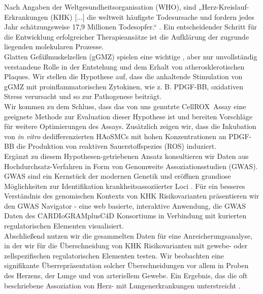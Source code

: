 Nach Angaben der Weltgesundheitsorganisation (WHO), sind „Herz-Kreislauf-Erkrankungen (KHK) [...] die weltweit häufigste Todesursache und fordern jedes Jahr schätzungsweise 17,9 Millionen Todesopfer.“ \cite{whoCardiovascularDiseases2022}. Ein entscheidender Schritt für die Entwicklung erfolgreicher Therapieansätze ist die Aufklärung der zugrunde liegenden molekularen Prozesse.\\
Glatten Gefäßmuskelzellen (gGMZ) spielen eine wichtige \cite{doranRoleSmoothMuscle2008}, aber nur unvollständig verstandene Rolle \cite{liuSmoothMuscleCell2019, grootaertVascularSmoothMuscle2021, yapSixShadesVascular2021} in der Entstehung und dem Erhalt von atherosklerotischen Plaques. Wir stellen die Hypothese auf, dass die anhaltende Stimulation von gGMZ mit proinflammatorischen Zytokinen, wie z. B. PDGF-BB, oxidativen Stress verursacht und so zur Pathogenese beiträgt.\\
Wir kommen zu dem Schluss, dass das von uns genutzte CellROX\texttrademark~Assay eine geeignete Methode zur Evaluation dieser Hypothese ist und bereiten Vorschläge für weitere Optimierungen des Assays. Zusätzlich zeigen wir, dass die Inkubation von \textit{in vitro} dedifferenzierten HAoSMCs mit hohen Konzentrationen an PDGF-BB die Produktion von reaktiven Sauerstoffspezies (ROS) induziert.\\
Ergänzt zu diesem Hypothesen-getriebenen Ansatz konsultieren wir Daten aus Hochdurchsatz-Verfahren in Form von Genomweite Assoziationsstudien (GWAS). GWAS sind ein Kernstück der modernen Genetik und eröffnen grandiose Möglichkeiten zur Identifikation krankheitsassoziierter Loci \cite{uffelmannGenomewideAssociationStudies2021}. Für ein besseres Verständnis des genomischen Kontexts von KHK Risikovarianten präsentieren wir den GWAS Navigator - eine web basierte, interaktive Anwendung, die GWAS Daten des CARDIoGRAMplusC4D Konsortiums \cite{aragamDiscoverySystematicCharacterization2021} in Verbindung mit kurierten regulatorischen Elementen visualisiert. \\
Abschließend nutzen wir die gesammelten Daten für eine Anreicherungsanalyse, in der wir für die Überschneidung von KHK Risikovarianten mit gewebe- oder zellspezifischen regulatorischen Elementen testen. Wir beobachten eine signifikante Überrepräsentation solcher Überschneidungen vor allem in Proben des Herzens, der Lunge und von arteriellem Gewebe. Ein Ergebnis, das die oft beschriebene Assoziation von Herz- mit Lungenerkrankungen unterstreicht \cite{carterAssociationCardiovascularDisease2019, nowakLungFunctionCoronary2018, hanPulmonaryDiseasesHeart2007}.
